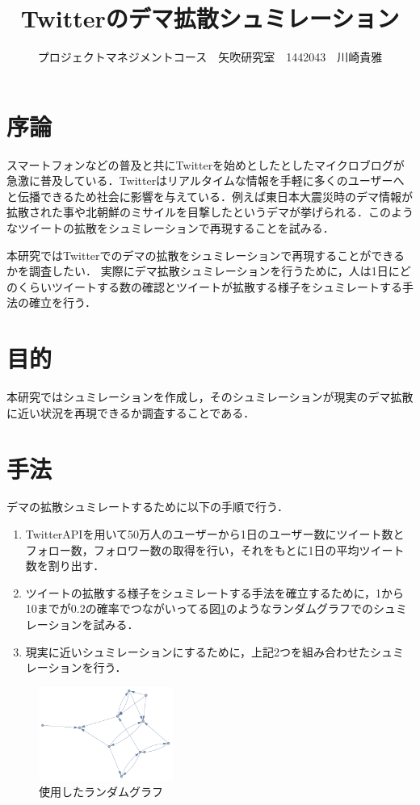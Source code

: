 \documentclass[uplatex,twocolumn,dvipdfmx]{jsarticle}
\title{\vspace{-5mm}\fontsize{14pt}{0pt}\selectfont Twitterのデマ拡散シュミレーション}
\author{\normalsize プロジェクトマネジメントコース　矢吹研究室　1442043　川崎貴雅}
\date{}
\begin{document}
\fontsize{10.5pt}{\baselineskip}\selectfont
\maketitle



\section{序論}\label{序論}

スマートフォンなどの普及と共にTwitterを始めとしたとしたマイクロブログが急激に普及している．Twitterはリアルタイムな情報を手軽に多くのユーザーへと伝播できるため社会に影響を与えている．例えば東日本大震災時のデマ情報が拡散された事や北朝鮮のミサイルを目撃したというデマが挙げられる．このようなツイートの拡散をシュミレーションで再現することを試みる．

本研究ではTwitterでのデマの拡散をシュミレーションで再現することができるかを調査したい．
実際にデマ拡散シュミレーションを行うために，人は1日にどのくらいツイートする数の確認とツイートが拡散する様子をシュミレートする手法の確立を行う．




\section{目的}

本研究ではシュミレーションを作成し，そのシュミレーションが現実のデマ拡散に近い状況を再現できるか調査することである．

\section{手法}

デマの拡散シュミレートするために以下の手順で行う．
\begin{enumerate}
\item TwitterAPIを用いて50万人のユーザーから1日のユーザー数にツイート数とフォロー数，フォロワー数の取得を行い，それをもとに1日の平均ツイート数を割り出す．
\item ツイートの拡散する様子をシュミレートする手法を確立するために，1から10までが0.2の確率でつながいってる図\ref{ランダムグラフ}のようなランダムグラフでのシュミレーションを試みる\cite{netto}．
\item 現実に近いシュミレーションにするために，上記2つを組み合わせたシュミレーションを行う．
\end{enumerate}
\begin{figure}[htb]
\centering
\includegraphics[width=44mm,clip]{graph.pdf}
\caption{使用したランダムグラフ}\label{ランダムグラフ}
\end{figure}
\end{document}
